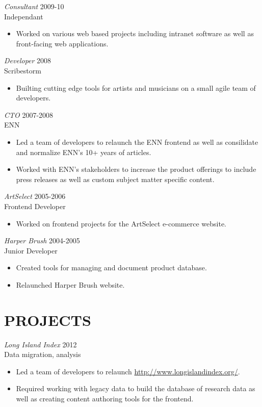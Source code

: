 \documentclass[line,margin]{res}
\begin{document}
\begin{resume}
    {\sl Consultant}
    \hfill 2009-10 \\
    Independant
    \begin{itemize} \itemsep -2pt
        \item
            Worked on various web based projects including intranet software as well
            as front-facing web applications.
    \end{itemize}

    {\sl Developer}
    \hfill 2008 \\
    Scribestorm
    \begin{itemize}
        \item
            Builting cutting edge tools for artists and musicians on a small agile team
            of developers.
    \end{itemize}

    {\sl CTO}
    \hfill 2007-2008 \\
    ENN
    \begin{itemize}
        \item
            Led a team of developers to relaunch the ENN frontend as well as
            consilidate and normalize ENN's 10+ years of articles.
        \item
            Worked with ENN's stakeholders to increase the product offerings to include
            press releases as well as custom subject matter specific content.
    \end{itemize}

    {\sl ArtSelect}
    \hfill 2005-2006 \\
    Frontend Developer
    \begin{itemize}
        \item
            Worked on frontend projects for the ArtSelect e-commerce website.
    \end{itemize}

    {\sl Harper Brush}
    \hfill 2004-2005 \\
    Junior Developer
    \begin{itemize}
        \item
            Created tools for managing and document product database.
        \item
            Relaunched Harper Brush website.
    \end{itemize}



\section{PROJECTS}
    {\sl Long Island Index}
    \hfill 2012 \\
    Data migration, analysis
    \begin{itemize} \itemsep -2pt
        \item
            Led a team of developers to relaunch \url{http://www.longislandindex.org/}.
        \item
            Required working with legacy data to build the database of research data as
            well as creating content authoring tools for the frontend.
    \end{itemize}


\end{resume}
\end{document}
